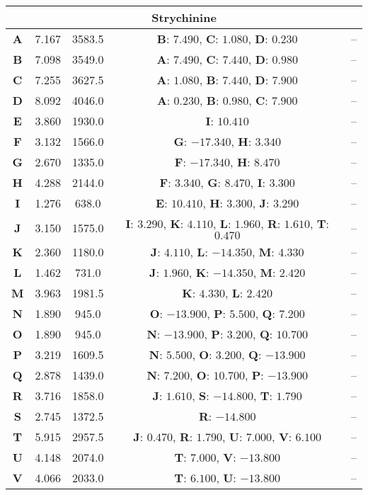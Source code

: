 \begin{longtable}[h!]{c c c c c}
\hline
\multicolumn{5}{c}{\textbf{Strychinine}}\\
\hline
\textbf{A} & 7.167 & 3583.5 & \textbf{B}: $7.490$, \textbf{C}: $1.080$, \textbf{D}: $0.230$& -- \\
\textbf{B} & 7.098 & 3549.0 & \textbf{A}: $7.490$, \textbf{C}: $7.440$, \textbf{D}: $0.980$& -- \\
\textbf{C} & 7.255 & 3627.5 & \textbf{A}: $1.080$, \textbf{B}: $7.440$, \textbf{D}: $7.900$& -- \\
\textbf{D} & 8.092 & 4046.0 & \textbf{A}: $0.230$, \textbf{B}: $0.980$, \textbf{C}: $7.900$& -- \\
\textbf{E} & 3.860 & 1930.0 & \textbf{I}: $10.410$& -- \\
\textbf{F} & 3.132 & 1566.0 & \textbf{G}: $-17.340$, \textbf{H}: $3.340$& -- \\
\textbf{G} & 2.670 & 1335.0 & \textbf{F}: $-17.340$, \textbf{H}: $8.470$& -- \\
\textbf{H} & 4.288 & 2144.0 & \textbf{F}: $3.340$, \textbf{G}: $8.470$, \textbf{I}: $3.300$& -- \\
\textbf{I} & 1.276 & 638.0 & \textbf{E}: $10.410$, \textbf{H}: $3.300$, \textbf{J}: $3.290$& -- \\
\textbf{J} & 3.150 & 1575.0 & \textbf{I}: $3.290$, \textbf{K}: $4.110$, \textbf{L}: $1.960$, \textbf{R}: $1.610$, \textbf{T}: $0.470$& -- \\
\textbf{K} & 2.360 & 1180.0 & \textbf{J}: $4.110$, \textbf{L}: $-14.350$, \textbf{M}: $4.330$& -- \\
\textbf{L} & 1.462 & 731.0 & \textbf{J}: $1.960$, \textbf{K}: $-14.350$, \textbf{M}: $2.420$& -- \\
\textbf{M} & 3.963 & 1981.5 & \textbf{K}: $4.330$, \textbf{L}: $2.420$& -- \\
\textbf{N} & 1.890 & 945.0 & \textbf{O}: $-13.900$, \textbf{P}: $5.500$, \textbf{Q}: $7.200$& -- \\
\textbf{O} & 1.890 & 945.0 & \textbf{N}: $-13.900$, \textbf{P}: $3.200$, \textbf{Q}: $10.700$& -- \\
\textbf{P} & 3.219 & 1609.5 & \textbf{N}: $5.500$, \textbf{O}: $3.200$, \textbf{Q}: $-13.900$& -- \\
\textbf{Q} & 2.878 & 1439.0 & \textbf{N}: $7.200$, \textbf{O}: $10.700$, \textbf{P}: $-13.900$& -- \\
\textbf{R} & 3.716 & 1858.0 & \textbf{J}: $1.610$, \textbf{S}: $-14.800$, \textbf{T}: $1.790$& -- \\
\textbf{S} & 2.745 & 1372.5 & \textbf{R}: $-14.800$& -- \\
\textbf{T} & 5.915 & 2957.5 & \textbf{J}: $0.470$, \textbf{R}: $1.790$, \textbf{U}: $7.000$, \textbf{V}: $6.100$& -- \\
\textbf{U} & 4.148 & 2074.0 & \textbf{T}: $7.000$, \textbf{V}: $-13.800$& -- \\
\textbf{V} & 4.066 & 2033.0 & \textbf{T}: $6.100$, \textbf{U}: $-13.800$& -- \\

\hline
\end{longtable}
